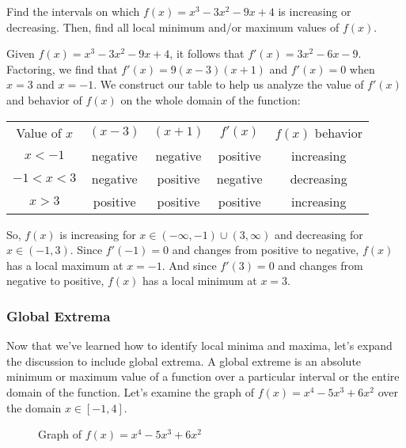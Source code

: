 \begin{Exercise}[label=locext1]
Find the intervals on which $f(x)=x^3-3x^2-9x+4$ is increasing or decreasing. Then, find all local minimum and/or maximum values of $f(x)$. 
\end{Exercise}

\begin{Answer}[ref=locext1]
Given $f(x)=x^3-3x^2-9x+4$, it follows that $f'(x)=3x^2-6x-9$. Factoring, we find that $f'(x) = 9(x-3)(x+1)$ and $f'(x) = 0$ when $x=3$ and $x=-1$. We construct our table to help us analyze the value of $f'(x)$ and behavior of $f(x)$ on the whole domain of the function:
\begin{center}
\begin{tabular}{c|c|c|c|c}
	Value of $x$ & $(x-3)$ & $(x+1)$ & $f'(x)$ & $f(x)$ behavior\\
	$x<-1$ & negative & negative & positive & increasing\\
	$-1<x<3$ & negative & positive & negative & decreasing\\
	$x>3$ & positive & positive & positive & increasing
\end{tabular}
\end{center}
So, $f(x)$ is increasing for $x \in (-\infty, -1) \cup (3, \infty)$ and decreasing for $x \in (-1, 3)$. Since $f'(-1)=0$ and changes from positive to negative, $f(x)$ has a local maximum at $x=-1$. And since $f'(3)=0$ and changes from negative to positive, $f(x)$ has a local minimum at $x=3$.
\end{Answer}

\subsubsection{Global Extrema}
Now that we've learned how to identify local minima and maxima, let's expand the discussion to include global extrema. A global extreme is an absolute minimum or maximum value of a function over a particular interval or the entire domain of the function. Let's examine the graph of $f(x) = x^4-5x^3+6x^2$ over the domain $x \in [-1,4]$.

\begin{figure}[htbp]
  \centering
  \caption{Graph of \( f(x) = x^4-5x^3+6x^2 \) }
\end{figure}

